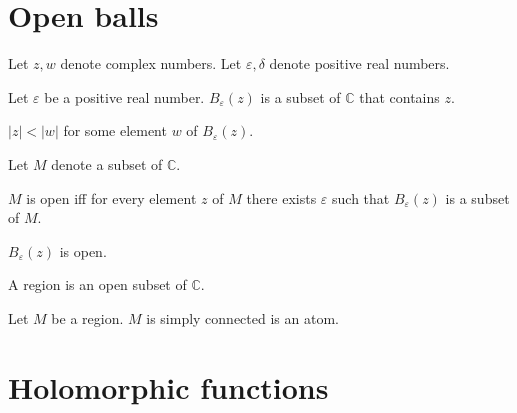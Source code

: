 \documentclass[english]{article}
\newcommand{\Ball}[2]{B_{#1}(#2)}
\begin{document}
\section{Open balls}

\begin{forthel}
Let $z, w$ denote complex numbers.
Let $\varepsilon, \delta$ denote positive real numbers.

\begin{signature}
  Let $\varepsilon$ be a positive real number.
  $\Ball{\varepsilon}{z}$ is a subset of $\mathbb{C}$ that contains $z$.
\end{signature}

\begin{axiom}
  $|z| < |w|$ for some element $w$ of $\Ball{\varepsilon}{z}$.
\end{axiom}

Let $M$ denote a subset of $\mathbb{C}$.

\begin{definition}
  $M$ is open iff for every element $z$ of $M$ there exists $\varepsilon$ such that
  $\Ball{\varepsilon}{z}$ is a subset of $M$.
\end{definition}

\begin{axiom}
  $\Ball{\varepsilon}{z}$ is open.
\end{axiom}

\begin{signature}
  A region is an open subset of $\mathbb{C}$.
\end{signature}

\begin{signature}
  Let $M$ be a region.
  $M$ is simply connected is an atom.
\end{signature}
\end{forthel}


\section{Holomorphic functions}
\end{document}
